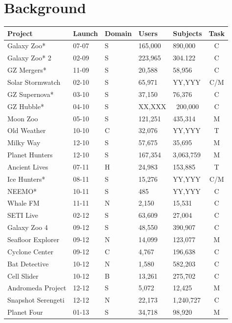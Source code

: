 \documentclass{sigchi}
\begin{document}
\section{Background}
\begin{table}
\begin{center}
\small
\begin{tabular}{p{2.2cm}lp{0.7cm}llc}
\hline
Project  & Launch & Domain & Users & Subjects & Task \\
\hline
\hline
Galaxy Zoo* & 07-07 & S & 165,000 & 890,000 & C \\
\hline
Galaxy Zoo* 2 & 02-09 & S & 223,965 & 304.122 & C \\
GZ Mergers* & 11-09 & S & 20,588 & 58,956 & C \\
\hline
Solar Stormwatch & 02-10 & S & 65,971 & YY,YYY & C/M \\
GZ Supernova* & 03-10 & S & 37,150 & 76,376 & C \\
GZ Hubble* & 04-10 & S & XX,XXX & ~200,000 & C \\
Moon Zoo & 05-10 & S & 121,251 & 435,314 & M \\
Old Weather & 10-10 & C & 32,076 & YY,YYY & T \\
Milky Way & 12-10 & S & 57,675 & 35,695 & M \\
Planet Hunters & 12-10 & S & 167,354 & 3,063,759 & M \\
\hline
Ancient Lives & 07-11 & H & 24,983 & 153,885 & T \\
Ice Hunters* & 08-11 & S & 15,276 & YY,YYY & C/M \\
NEEMO* & 10-11 & S & 485 & YY,YYY & C \\
Whale FM & 11-11 & N & 2,150 & 15,531 & C \\
\hline
SETI Live & 02-12 & S & 63,609 & 27,004 & C \\
Galaxy Zoo 4 & 09-12 & S & 48,550 & 390,907 & C \\
Seafloor Explorer & 09-12 & N & 14,099 & 123,077 & M \\
Cyclone Center & 09-12 & C & 4,767 & 196,638 & C \\
Bat Detective & 10-12 & N & 1,580 & 582,203 & C \\
Cell Slider & 10-12 & B & 13,261 & 275,702 & C \\
Andromeda Project & 12-12 & S & 5,072 & 12,425 & M \\
Snapshot Serengeti & 12-12 & N & 22,173 & 1,240,727 & C \\
\hline
Planet Four & 01-13 & S & 34,718 & 98,920 & M \\

\end{tabular}
\end{center}
\end{table}
\end{document}
